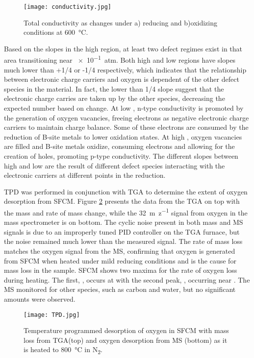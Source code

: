     \begin{figure}
      \texttt{[image: conductivity.jpg]}
      \caption{Total conductivity as  changes under a) reducing and b)oxidizing conditions at \SI{600}{\celsius}.}
      \label{fig:conductivity}
    \end{figure}

    Based on the slopes in the high  region, at least two defect regimes exist in that area transitioning near \SI{e-1}{atm}.
    Both high and low  regions have slopes much lower than +1/4 or -1/4 respectively, which indicates that the relationship between electronic charge carriers and oxygen is dependent of the other defect species in the material.
    In fact, the lower than 1/4 slope suggest that the electronic charge carries are taken up by the other species, decreasing the expected number based on  change.
    At low , n-type conductivity is promoted by the generation of oxygen vacancies, freeing electrons as negative electronic charge carriers to maintain charge balance.
    Some of these electrons are consumed by the reduction of B-site metals to lower oxidation states.
    At high , oxygen vacancies are filled and B-site metals oxidize, consuming electrons and allowing for the creation of holes, promoting p-type conductivity.
    The different slopes between high and low  are the result of different defect species interacting with the electronic carriers at different points in the reduction.

    TPD was performed in conjunction with TGA to determine the extent of oxygen desorption from SFCM.
    Figure \ref{fig:TPD} presents the data from the TGA on top with the mass and rate of mass change, while the \SI{32}{m\per z} signal from oxygen in the mass spectrometer is on bottom.
    The cyclic noise present in both mass and MS signals is due to an improperly tuned PID controller on the TGA furnace, but the noise remained much lower than the measured signal.
    The rate of mass loss matches the oxygen signal from the MS, confirming that oxygen is generated from SFCM when heated under mild reducing conditions and is the cause for mass loss in the sample.
    SFCM shows two maxima for the rate of oxygen loss during heating.
    The first, \textalpha, occurs at  with the second peak, \textbeta, occurring near .
    The MS monitored for other species, such as carbon and water, but no significant amounts were observed.

    \begin{figure}
      \texttt{[image: TPD.jpg]}
      \caption{Temperature programmed desorption of oxygen in SFCM with mass loss from TGA(top) and oxygen desorption from MS (bottom) as it is heated to \SI{800}{\celsius} in N\textsubscript{2}.}
      \label{fig:TPD}
    \end{figure}

